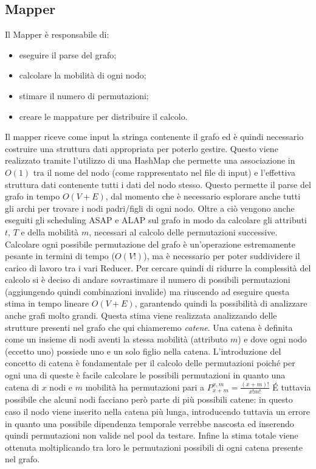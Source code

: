 \documentclass[]{IEEEtran}
\begin{document}
\subsection{Mapper}
Il Mapper è responsabile di:
\begin{itemize}
	\item eseguire il parse del grafo;
	\item calcolare la mobilità di ogni nodo;
	\item stimare il numero di permutazioni;
	\item creare le mappature per distribuire il calcolo.
\end{itemize}
Il mapper riceve come input la stringa contenente il grafo ed è quindi necessario costruire una struttura dati appropriata per poterlo gestire. Questo viene realizzato tramite l'utilizzo di una HashMap che permette una associazione in $O(1)$ tra il nome del nodo (come rappresentato nel file di input) e l'effettiva struttura dati contenente tutti i dati del nodo stesso. Questo permette il parse del grafo in tempo $O(V+E)$, dal momento che è necessario esplorare anche tutti gli archi per trovare i nodi padri/figli di ogni nodo. Oltre a ciò vengono anche eseguiti gli scheduling ASAP e ALAP sul grafo in modo da calcolare gli attributi $t$, $T$ e della mobilità $m$, necessari al calcolo delle permutazioni successive.
Calcolare ogni possibile permutazione del grafo è un'operazione estremamente pesante in termini di tempo ($O(V!)$), ma è necessario per poter suddividere il carico di lavoro tra i vari Reducer. Per cercare quindi di ridurre la complessità del calcolo si è  deciso di andare sovrastimare il numero di possibili permutazioni (aggiungendo quindi combinazioni invalide) ma riuscendo ad eseguire questa stima in tempo lineare $O(V+E)$, garantendo quindi la possibilità di analizzare anche grafi molto grandi. Questa stima viene realizzata analizzando delle strutture presenti nel grafo che qui chiameremo \emph{catene}. Una catena è definita come un insieme di nodi aventi la stessa mobilità (attributo $m$) e dove ogni nodo (eccetto uno) possiede uno e un solo figlio nella catena.
L'introduzione del concetto di catena è fondamentale per il calcolo delle permutazioni poiché per ogni una di queste è facile calcolare le possibili permutazioni in quanto una catena di $x$ nodi e $m$ mobilità ha permutazioni pari a $P_{x+m}^{x,m} = \frac{(x+m)!}{x!m!}$
\'E tuttavia possibile che alcuni nodi facciano però parte di più possibili catene: in questo caso il nodo viene inserito nella catena più lunga, introducendo tuttavia un errore in quanto una possibile dipendenza temporale verrebbe nascosta ed inserendo quindi permutazioni non valide nel pool da testare.
Infine la stima totale viene ottenuta moltiplicando tra loro le permutazioni possibili di ogni catena presente nel grafo.
\end{document}
